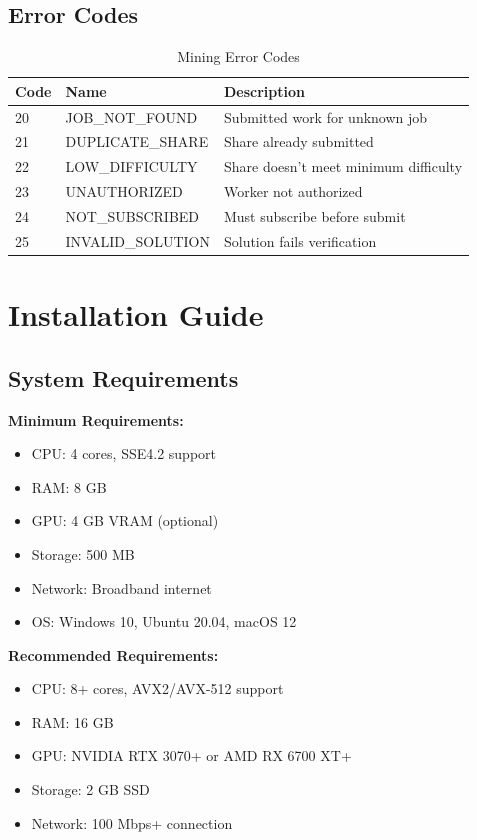 \documentclass[11pt,a4paper]{article}
\begin{document}
\subsection{Error Codes}

\begin{table}[H]
\centering
\begin{tabular}{|l|l|p{6cm}|}
\hline
\textbf{Code} & \textbf{Name} & \textbf{Description} \\
\hline
20 & JOB\_NOT\_FOUND & Submitted work for unknown job \\
21 & DUPLICATE\_SHARE & Share already submitted \\
22 & LOW\_DIFFICULTY & Share doesn't meet minimum difficulty \\
23 & UNAUTHORIZED & Worker not authorized \\
24 & NOT\_SUBSCRIBED & Must subscribe before submit \\
25 & INVALID\_SOLUTION & Solution fails verification \\
\hline
\end{tabular}
\caption{Mining Error Codes}
\end{table}

\section{Installation Guide}

\subsection{System Requirements}

\textbf{Minimum Requirements:}
\begin{itemize}
    \item CPU: 4 cores, SSE4.2 support
    \item RAM: 8 GB
    \item GPU: 4 GB VRAM (optional)
    \item Storage: 500 MB
    \item Network: Broadband internet
    \item OS: Windows 10, Ubuntu 20.04, macOS 12
\end{itemize}

\textbf{Recommended Requirements:}
\begin{itemize}
    \item CPU: 8+ cores, AVX2/AVX-512 support
    \item RAM: 16 GB
    \item GPU: NVIDIA RTX 3070+ or AMD RX 6700 XT+
    \item Storage: 2 GB SSD
    \item Network: 100 Mbps+ connection
\end{itemize}
\end{document}
